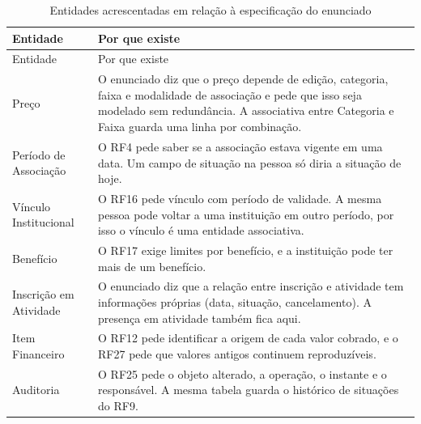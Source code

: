 \begin{longtable}{@{}L{3.6cm} L{10.7cm}@{}}
\caption{Entidades acrescentadas em relação à especificação do enunciado}\label{tab:adicionadas}\\
\toprule
Entidade & Por que existe\\
\midrule
\endfirsthead
\toprule
Entidade & Por que existe\\
\midrule
\endhead
\bottomrule
\endfoot
Preço & O enunciado diz que o preço depende de edição, categoria, faixa e modalidade de associação e pede que isso seja modelado sem redundância. A associativa entre Categoria e Faixa guarda uma linha por combinação.\\
Período de Associação & O RF4 pede saber se a associação estava vigente em uma data. Um campo de situação na pessoa só diria a situação de hoje.\\
Vínculo Institucional & O RF16 pede vínculo com período de validade. A mesma pessoa pode voltar a uma instituição em outro período, por isso o vínculo é uma entidade associativa.\\
Benefício & O RF17 exige limites por benefício, e a instituição pode ter mais de um benefício.\\
Inscrição em Atividade & O enunciado diz que a relação entre inscrição e atividade tem informações próprias (data, situação, cancelamento). A presença em atividade também fica aqui.\\
Item Financeiro & O RF12 pede identificar a origem de cada valor cobrado, e o RF27 pede que valores antigos continuem reproduzíveis.\\
Auditoria & O RF25 pede o objeto alterado, a operação, o instante e o responsável. A mesma tabela guarda o histórico de situações do RF9.\\
\end{longtable}

